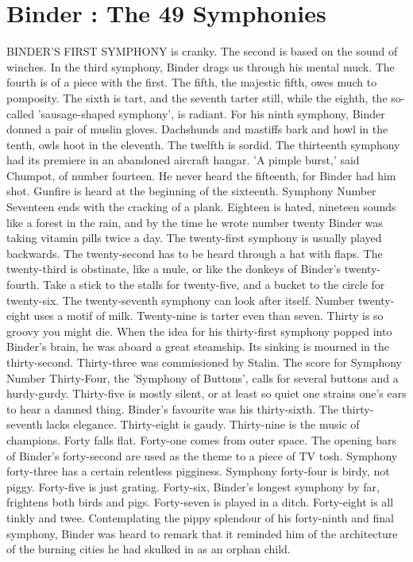 \chapter{Binder : The 49 Symphonies}

BINDER'S FIRST SYMPHONY is cranky. The second is based on the sound of winches. In the third symphony, Binder drags us through his mental muck. The fourth is of a piece with the first. The fifth, the majestic fifth, owes much to pomposity. The sixth is tart, and the seventh tarter still, while the eighth, the so-called 'sausage-shaped symphony', is radiant. For his ninth symphony, Binder donned a pair of muslin gloves. Dachshunds and mastiffs bark and howl in the tenth, owls hoot in the eleventh. The twelfth is sordid. The thirteenth symphony had its premiere in an abandoned aircraft hangar. 'A pimple burst,' said Chumpot, of number fourteen. He never heard the fifteenth, for Binder had him shot. Gunfire is heard at the beginning of the sixteenth. Symphony Number Seventeen ends with the cracking of a plank. Eighteen is hated, nineteen sounds like a forest in the rain, and by the time he wrote number twenty Binder was taking vitamin pills twice a day. The twenty-first symphony is usually played backwards. The twenty-second has to be heard through a hat with flaps. The twenty-third is obstinate, like a mule, or like the donkeys of Binder's twenty-fourth. Take a stick to the stalls for twenty-five, and a bucket to the circle for twenty-six. The twenty-seventh symphony can look after itself. Number twenty-eight uses a motif of milk. Twenty-nine is tarter even than seven. Thirty is so groovy you might die. When the idea for his thirty-first symphony popped into Binder's brain, he was aboard a great steamship. Its sinking is mourned in the thirty-second. Thirty-three was commissioned by Stalin. The score for Symphony Number Thirty-Four, the 'Symphony of Buttons', calls for several buttons and a hurdy-gurdy. Thirty-five is mostly silent, or at least so quiet one strains one's ears to hear a damned thing. Binder's favourite was his thirty-sixth. The thirty-seventh lacks elegance. Thirty-eight is gaudy. Thirty-nine is the music of champions. Forty falls flat. Forty-one comes from outer space. The opening bars of Binder's forty-second are used as the theme to a piece of TV tosh. Symphony forty-three has a certain relentless pigginess. Symphony forty-four is birdy, not piggy. Forty-five is just grating. Forty-six, Binder's longest symphony by far, frightens both birds and pigs. Forty-seven is played in a ditch. Forty-eight is all tinkly and twee. Contemplating the pippy splendour of his forty-ninth and final symphony, Binder was heard to remark that it reminded him of the architecture of the burning cities he had skulked in as an orphan child.